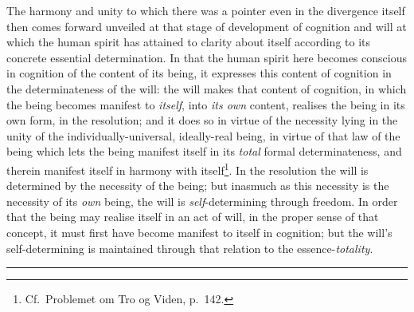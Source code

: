 \documentclass[12pt,a4paper]{book}
\begin{document}
The harmony and unity to which there was a pointer even in the divergence
itself then comes forward unveiled at that stage of development of cognition
and will at which the human spirit has attained to clarity about itself
according to its concrete essential determination. In that the human spirit
here becomes conscious in cognition of the content of its being, it expresses
this content of cognition in the determinateness of the will: the will makes
that content of cognition, in which the being becomes manifest to
\emph{itself}, into \emph{its own} content, realises the being in its own
form, in the resolution; and it does so in virtue of the necessity lying in
the unity of the individually-universal, ideally-real being, in virtue of that
law of the being which lets the being manifest itself in its \emph{total}
formal determinateness, and therein manifest itself in harmony with
itself\footnote{Cf.\ Problemet om Tro og Viden, p.\ 142.}.
In the resolution the will is determined by the necessity of the being; but
inasmuch as this necessity is the necessity of its \emph{own} being, the will
is \emph{self}-determining through freedom.
In order that the being may realise itself in an act of will, in the proper
sense of that concept, it must first have become manifest to itself in
cognition; but the will's self-determining is maintained through that relation
to the essence-\emph{totality}.

\begin{center}\rule{2cm}{0.4pt}\end{center}
\end{document}
